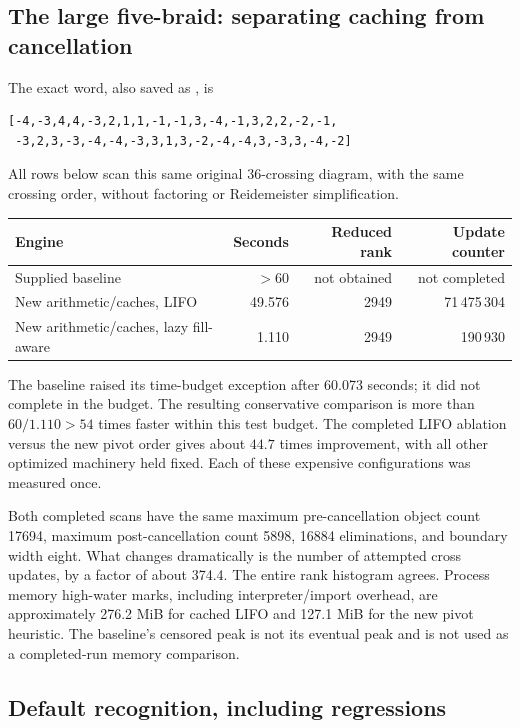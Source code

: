 \documentclass[11pt,letterpaper]{article}
\theoremstyle{definition}\newtheorem{definition}[theorem]{Definition}
\theoremstyle{remark}\newtheorem{remark}[theorem]{Remark}
\newcommand{\code}[1]{\texttt{\detokenize{#1}}}
\begin{document}
\subsection{The large five-braid: separating caching from cancellation}

The exact word, also saved as \code{examples/random_5_braid_36.json}, is
\begin{lstlisting}
[-4,-3,4,4,-3,2,1,1,-1,-1,3,-4,-1,3,2,2,-2,-1,
 -3,2,3,-3,-4,-4,-3,3,1,3,-2,-4,-4,3,-3,3,-4,-2]
\end{lstlisting}
All rows below scan this same original 36-crossing diagram, with the same
crossing order, without factoring or Reidemeister simplification.

\begin{center}
\small
\begin{tabular}{lrrr}
\toprule
Engine & Seconds & Reduced rank & Update counter\\
\midrule
Supplied baseline & $>60$ & not obtained & not completed\\
New arithmetic/caches, LIFO & 49.576 & 2949 & 71\,475\,304\\
New arithmetic/caches, lazy fill-aware & 1.110 & 2949 & 190\,930\\
\bottomrule
\end{tabular}
\end{center}
The baseline raised its time-budget exception after 60.073 seconds; it did not
complete in the budget. The resulting conservative comparison is more than
$60/1.110>54$ times faster within this test budget. The completed LIFO ablation
versus the new pivot order gives about $44.7$ times improvement, with all other
optimized machinery held fixed. Each of these expensive configurations was
measured once.

Both completed scans have the same maximum pre-cancellation object count
17694, maximum post-cancellation count 5898, 16884 eliminations, and boundary
width eight. What changes dramatically is the number of attempted cross updates,
by a factor of about 374.4. The entire rank histogram agrees. Process memory
high-water marks, including interpreter/import overhead, are approximately
276.2 MiB for cached LIFO and 127.1 MiB for the new pivot heuristic. The baseline's
censored peak is not its eventual peak and is not used as a completed-run memory
comparison.

\subsection{Default recognition, including regressions}
\end{document}
